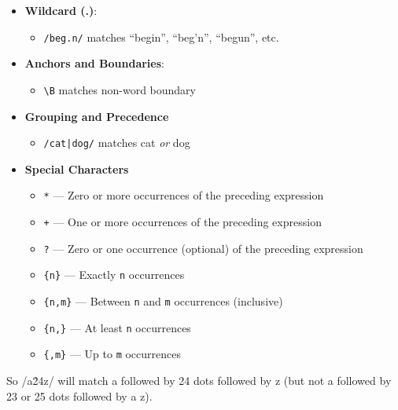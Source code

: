 \documentclass{article}
\begin{document}
\begin{itemize}
    \item \textbf{Wildcard (.)}:
          \begin{itemize}
              \item \texttt{/beg.n/} matches “begin”, “beg’n”, “begun”, etc.
          \end{itemize}

    \item \textbf{Anchors and Boundaries}:
          \begin{itemize}
              \item \texttt{\textbackslash{}B} matches non-word boundary
          \end{itemize}
    \item \textbf{Grouping and Precedence}
          \begin{itemize}
              \item \texttt{/cat|dog/} matches cat \textit{or} dog
          \end{itemize}
    \item \textbf{Special Characters}
          \begin{itemize}
              \item \texttt{*} — Zero or more occurrences of the preceding expression
              \item \texttt{+} — One or more occurrences of the preceding expression
              \item \texttt{?} — Zero or one occurrence (optional) of the preceding expression
              \item \texttt{\{n\}} — Exactly \texttt{n} occurrences
              \item \texttt{\{n,m\}} — Between \texttt{n} and \texttt{m} occurrences (inclusive)
              \item \texttt{\{n,\}} — At least \texttt{n} occurrences
              \item \texttt{\{,m\}} — Up to \texttt{m} occurrences
          \end{itemize}
\end{itemize}






So /a\.{24}z/ will match
a followed by 24 dots followed by z (but not a followed by 23 or 25 dots followed
by a z).
\end{document}
